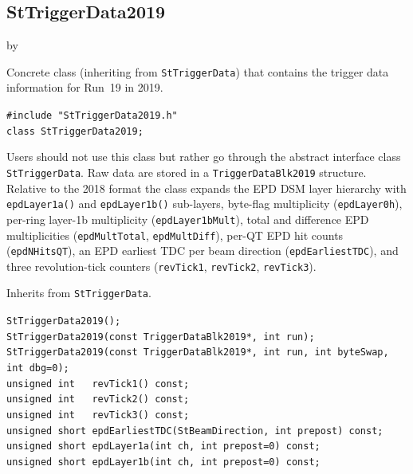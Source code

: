 \documentclass[twoside]{article}
\newcommand{\entrylabel}[1]{\mbox{\textbf{{#1}}}\hfil}%
\newenvironment{entry}
{\begin{list}{}%
    {\renewcommand{\makelabel}{\entrylabel}%
     \setlength{\labelwidth}{90pt}%
     \setlength{\leftmargin}{\labelwidth}
     \advance\leftmargin by \labelsep%
      }%
    }%
  {\end{list}}
\newcommand{\Entrylabel}[1]%
{\raisebox{0pt}[1ex][0pt]{\makebox[\labelwidth][l]%
    {\parbox[t]{\labelwidth}{\hspace{0pt}\textbf{{#1}}}}}}
\newenvironment{Entry}%
{\renewcommand{\entrylabel}{\Entrylabel}\begin{entry}}%
  {\end{entry}}
\begin{document}
\subsection{StTriggerData2019}
\label{sec:StTriggerData2019}
\begin{Entry}
\item[Summary] Concrete class (inheriting from \texttt{StTriggerData}) that
    contains the trigger data information for Run~19 in 2019.
\item[Synopsis]
    \verb+#include "StTriggerData2019.h"+\\
    \verb+class StTriggerData2019;+\\
\item[Description] Users should not use this class but rather go through the
    abstract interface class \texttt{StTriggerData}.  Raw data are stored in a
    \verb+TriggerDataBlk2019+ structure.  Relative to the 2018 format the class
    expands the EPD DSM layer hierarchy with \verb+epdLayer1a()+ and
    \verb+epdLayer1b()+ sub-layers, byte-flag multiplicity
    (\verb+epdLayer0h+), per-ring layer-1b multiplicity
    (\verb+epdLayer1bMult+), total and difference EPD multiplicities
    (\verb+epdMultTotal+, \verb+epdMultDiff+), per-QT EPD hit counts
    (\verb+epdNHitsQT+), an EPD earliest TDC per beam direction
    (\verb+epdEarliestTDC+), and three revolution-tick counters
    (\verb+revTick1+, \verb+revTick2+, \verb+revTick3+).
\item[Related Classes] Inherits from \texttt{StTriggerData}.
\item[Public\\ Constructors]
    \verb+StTriggerData2019();+\\
    \verb+StTriggerData2019(const TriggerDataBlk2019*, int run);+\\
    \verb+StTriggerData2019(const TriggerDataBlk2019*, int run, int byteSwap, int dbg=0);+\\
    \verb+unsigned int   revTick1() const;+\\
    \verb+unsigned int   revTick2() const;+\\
    \verb+unsigned int   revTick3() const;+\\
    \verb+unsigned short epdEarliestTDC(StBeamDirection, int prepost) const;+\\
    \verb+unsigned short epdLayer1a(int ch, int prepost=0) const;+\\
    \verb+unsigned short epdLayer1b(int ch, int prepost=0) const;+\\

\end{Entry}
\end{document}
